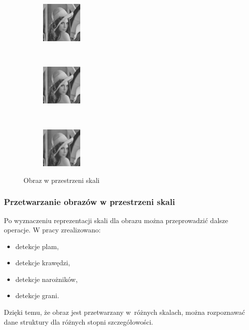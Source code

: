 \begin{frame}
\begin{figure}[h]
\begin{center}
		 
\begin{subfigure}[b]{2cm}
                 \centering
                 \includegraphics[width=2cm]{Lena_scales4.jpg}
         \end{subfigure}%
		 ~
		 \begin{subfigure}[b]{2cm}
                 \centering
                 \includegraphics[width=2cm]{Lena_scales5.jpg}
         \end{subfigure}%
		 ~
\begin{subfigure}[b]{2cm}
                 \centering
                 \includegraphics[width=2cm]{Lena_scales6.jpg}
         \end{subfigure}%
\caption{Obraz w przestrzeni skali}
\label{lena_scales}
\end{center}
\end{figure}
\end{frame}


\begin{frame}
\frametitle{Przetwarzanie obrazów w przestrzeni skali}

Po wyznaczeniu reprezentacji skali dla obrazu można przeprowadzić dalsze operacje. W pracy zrealizowano:
\begin{itemize}
\item detekcje plam,
\item detekcje krawędzi,
\item detekcje narożników,
\item detekcje grani.
\end{itemize}
Dzięki temu, że obraz jest przetwarzany w~różnych skalach, można rozpoznawać dane struktury dla różnych stopni szczegółowości.
\end{frame}

